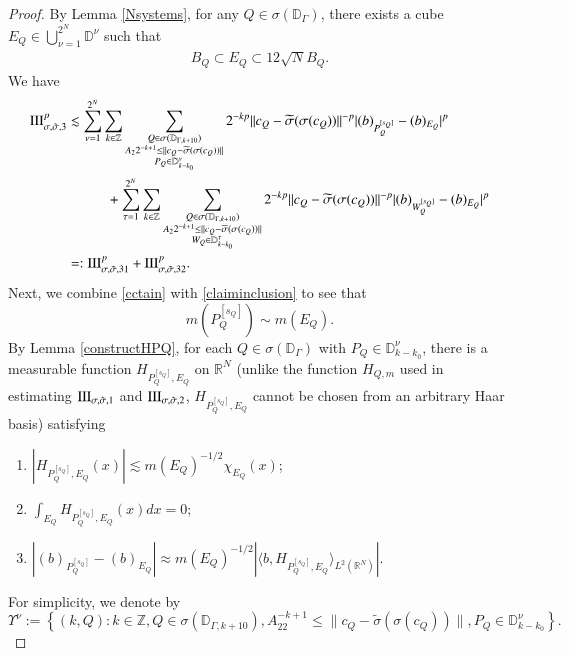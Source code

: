 \documentclass[12pt]{amsart}
\begin{document}
\begin{proof}
By Lemma \ref{Nsystems}, for any $Q\in\sigma(\mathbb{D}_{\Gamma})$, there exists a cube $E_Q\in {\displaystyle\bigcup_{\nu=1}^{2^N}\mathbb{D}^\nu}$ such that
\begin{align}\label{cctain}
B_Q\subset E_Q\subset 12\sqrt{N} B_Q.
\end{align}
We have
\begin{align}
  {\rm III}_{\sigma,\tilde{\sigma},3}^p
  &\lesssim \sum_{\nu=1}^{2^N}\sum_{k\in\mathbb{Z}}\sum_{\substack{Q\in\sigma(\mathbb{D}_{\Gamma,k+10})\nonumber\\ A_22^{-k+1}\leq \|c_Q-\widetilde{\sigma}(\sigma(c_Q))\|\\ P_Q\in\mathbb{D}_{k-k_0}^\nu}}2^{-kp}\|c_Q-\widetilde{\sigma}(\sigma(c_Q))\|^{-p}|(b)_{P_Q^{[s_Q]}}-(b)_{E_Q}|^p\nonumber\\
  &\hspace{1.0cm}+\sum_{\tau=1}^{2^N}\sum_{k\in\mathbb{Z}}\sum_{\substack{Q\in\sigma(\mathbb{D}_{\Gamma,k+10})\nonumber\\ A_22^{-k+1}\leq \|c_Q-\widetilde{\sigma}(\sigma(c_Q))\|\\ W_Q\in\mathbb{D}_{k-k_0}^\tau }}2^{-kp}\|c_Q-\widetilde{\sigma}(\sigma(c_Q))\|^{-p}|(b)_{W_Q^{[s_Q]}}-(b)_{E_Q}|^p\nonumber\\
  &=:{\rm III}_{\sigma,\tilde{\sigma},31}^p+{\rm III}_{\sigma,\tilde{\sigma},32}^p.
\end{align}
Next, we combine \eqref{cctain} with \eqref{claiminclusion} to see that
$$m(P_Q^{[s_Q]})\sim m(E_Q).$$
By Lemma \ref{constructHPQ}, for each $Q\in\sigma(\mathbb{D}_{\Gamma})$ with $P_Q\in\mathbb{D}_{k-k_0}^\nu$, there is a measurable function $H_{P_Q^{[s_Q]},E_Q}$ on $\mathbb{R}^N$ (unlike the function $H_{Q,m}$ used in estimating ${\rm III}_{\sigma,\tilde{\sigma},1}$ and ${\rm III}_{\sigma,\tilde{\sigma},2}$, $H_{P_Q^{[s_Q]},E_Q}$ cannot be chosen from an arbitrary Haar basis) satisfying
\begin{enumerate}
  \item $|H_{P_Q^{[s_Q]},E_Q}(x)|\lesssim m(E_Q)^{-1/2}\chi_{E_Q}(x)$;\smallskip
  \item $\int_{E_Q} H_{P_Q^{[s_Q]},E_Q}(x)dx=0$;\smallskip
  \item $|(b)_{P_Q^{[s_Q]}}-(b)_{E_Q}|\approx m(E_Q)^{-1/2}|\langle b,H_{P_Q^{[s_Q]},E_Q}\rangle_{L^2(\mathbb{R}^N)}|$.
\end{enumerate}
For simplicity, we denote by
$$\Upsilon^\nu:=\left\{(k,Q):k\in\mathbb{Z}, Q\in\mathcal{\sigma}(\mathbb{D}_{\Gamma,k+10}),A_22^{-k+1}\leq \|c_Q-\widetilde{\sigma}(\sigma(c_Q))\|,P_Q\in\mathbb{D}_{k-k_0}^\nu\right\}.$$


\end{proof}
\end{document}
